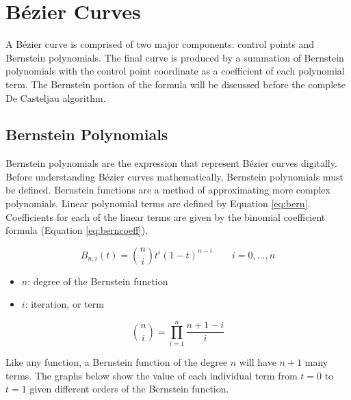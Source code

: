 \documentclass[12pt,letterpaper]{article}
\begin{document}
\section{B\'ezier Curves}

A B\'ezier curve is comprised of two major components: control points and Bernstein polynomials. The final curve is produced by a summation of Bernstein polynomials with the control point coordinate as a coefficient of each polynomial term. The Bernstein portion of the formula will be discussed before the complete De Casteljau algorithm.

\subsection{Bernstein Polynomials}
Bernstein polynomials are the expression that represent B\'ezier curves digitally. Before understanding B\'ezier curves mathematically, Bernstein polynomials must be defined. Bernstein functions are a method of approximating more complex polynomials. Linear polynomial terms are defined by Equation \ref{eq:bern}. Coefficients for each of the linear terms are given by the binomial coefficient formula (Equation \ref{eq:berncoeff}).

\begin{singlespace}
\begin{equation}
    \label{eq:bern}
    B_{n,i}(t) = \binom{n}{i} t^i (1-t)^{n-i} \qquad i=0,...,n
\end{equation}
\begin{small}
		\begin{itemize}[label=]
    	\item $n$: degree of the Bernstein function
    	\item $i$: iteration, or term
		\end{itemize}
\end{small}
\begin{equation}
    \label{eq:berncoeff}
    \binom{n}{i} = \prod_{i=1}^{n} \frac{n+1-i}{i}
\end{equation}
\end{singlespace}

Like any function, a Bernstein function of the degree $n$ will have $n+1$ many terms. The graphs below show the value of each individual term from $t=0$ to $t=1$ given different orders of the Bernstein function. 
\end{document}

